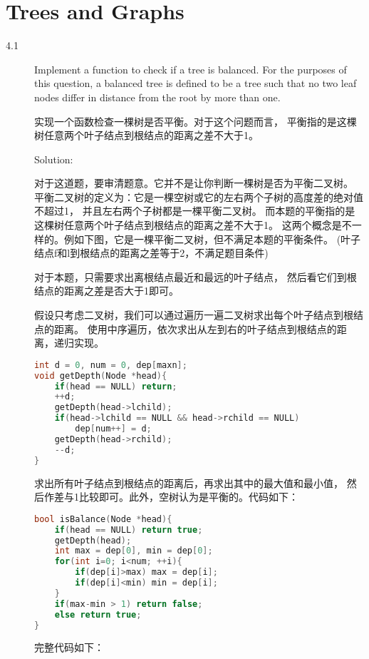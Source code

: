 \chapter{Trees and Graphs}
\small{}

\begin{description}
\item[4.1] Implement a function to check if a tree is balanced. For the purposes of this question, a balanced tree is defined to be a tree such that no two leaf nodes differ in distance from the root by more than one.

实现一个函数检查一棵树是否平衡。对于这个问题而言， 平衡指的是这棵树任意两个叶子结点到根结点的距离之差不大于1。

Solution: 

对于这道题，要审清题意。它并不是让你判断一棵树是否为平衡二叉树。 平衡二叉树的定义为：它是一棵空树或它的左右两个子树的高度差的绝对值不超过1， 并且左右两个子树都是一棵平衡二叉树。 而本题的平衡指的是这棵树任意两个叶子结点到根结点的距离之差不大于1。 这两个概念是不一样的。例如下图，它是一棵平衡二叉树，但不满足本题的平衡条件。 (叶子结点f和l到根结点的距离之差等于2，不满足题目条件)

对于本题，只需要求出离根结点最近和最远的叶子结点， 然后看它们到根结点的距离之差是否大于1即可。

假设只考虑二叉树，我们可以通过遍历一遍二叉树求出每个叶子结点到根结点的距离。 使用中序遍历，依次求出从左到右的叶子结点到根结点的距离，递归实现。

\begin{lstlisting}[language=C++]
int d = 0, num = 0, dep[maxn];
void getDepth(Node *head){
    if(head == NULL) return;
    ++d;
    getDepth(head->lchild);
    if(head->lchild == NULL && head->rchild == NULL)
        dep[num++] = d;
    getDepth(head->rchild);
    --d;
}
\end{lstlisting}

求出所有叶子结点到根结点的距离后，再求出其中的最大值和最小值， 然后作差与1比较即可。此外，空树认为是平衡的。代码如下：

\begin{lstlisting}[language=C++]
bool isBalance(Node *head){
    if(head == NULL) return true;
    getDepth(head);
    int max = dep[0], min = dep[0];
    for(int i=0; i<num; ++i){
        if(dep[i]>max) max = dep[i];
        if(dep[i]<min) min = dep[i];
    }
    if(max-min > 1) return false;
    else return true;
}
\end{lstlisting}

完整代码如下：


\end{description}
